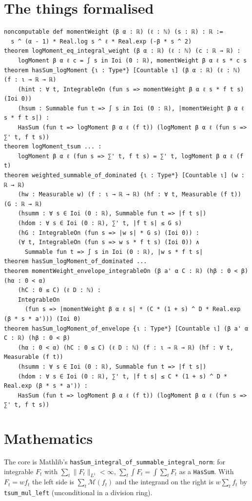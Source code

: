 \documentclass[11pt]{article}
\begin{document}
\section{The things formalised}
{\small
\begin{verbatim}
noncomputable def momentWeight (β α : ℝ) (ℓ : ℕ) (s : ℝ) : ℝ :=
  s ^ (α - 1) * Real.log s ^ ℓ * Real.exp (-β * s ^ 2)
theorem logMoment_eq_integral_weight (β α : ℝ) (ℓ : ℕ) (c : ℝ → ℝ) :
    logMoment β α ℓ c = ∫ s in Ioi (0 : ℝ), momentWeight β α ℓ s * c s
theorem hasSum_logMoment {ι : Type*} [Countable ι] (β α : ℝ) (ℓ : ℕ) (f : ι → ℝ → ℝ)
    (hint : ∀ t, IntegrableOn (fun s => momentWeight β α ℓ s * f t s) (Ioi 0))
    (hsum : Summable fun t => ∫ s in Ioi (0 : ℝ), |momentWeight β α ℓ s * f t s|) :
    HasSum (fun t => logMoment β α ℓ (f t)) (logMoment β α ℓ (fun s => ∑' t, f t s))
theorem logMoment_tsum ... :
    logMoment β α ℓ (fun s => ∑' t, f t s) = ∑' t, logMoment β α ℓ (f t)
theorem weighted_summable_of_dominated {ι : Type*} [Countable ι] (w : ℝ → ℝ)
    (hw : Measurable w) (f : ι → ℝ → ℝ) (hf : ∀ t, Measurable (f t)) (G : ℝ → ℝ)
    (hsumm : ∀ s ∈ Ioi (0 : ℝ), Summable fun t => |f t s|)
    (hdom : ∀ s ∈ Ioi (0 : ℝ), ∑' t, |f t s| ≤ G s)
    (hG : IntegrableOn (fun s => |w s| * G s) (Ioi 0)) :
    (∀ t, IntegrableOn (fun s => w s * f t s) (Ioi 0)) ∧
      Summable fun t => ∫ s in Ioi (0 : ℝ), |w s * f t s|
theorem hasSum_logMoment_of_dominated ...
theorem momentWeight_envelope_integrableOn (β a' α C : ℝ) (hβ : 0 < β) (hα : 0 < α)
    (hC : 0 ≤ C) (ℓ D : ℕ) :
    IntegrableOn
      (fun s => |momentWeight β α ℓ s| * (C * (1 + s) ^ D * Real.exp (β * s * a'))) (Ioi 0)
theorem hasSum_logMoment_of_envelope {ι : Type*} [Countable ι] (β a' α C : ℝ) (hβ : 0 < β)
    (hα : 0 < α) (hC : 0 ≤ C) (ℓ D : ℕ) (f : ι → ℝ → ℝ) (hf : ∀ t, Measurable (f t))
    (hsumm : ∀ s ∈ Ioi (0 : ℝ), Summable fun t => |f t s|)
    (hdom : ∀ s ∈ Ioi (0 : ℝ), ∑' t, |f t s| ≤ C * (1 + s) ^ D * Real.exp (β * s * a')) :
    HasSum (fun t => logMoment β α ℓ (f t)) (logMoment β α ℓ (fun s => ∑' t, f t s))
\end{verbatim}
}

\section{Mathematics}

The core is Mathlib's \texttt{hasSum\_integral\_of\_summable\_integral\_norm}: for integrable
$F_t$ with $\sum_t\|F_t\|_{L^1}<\infty$, $\sum_t\int F_t=\int\sum_tF_t$ as a \texttt{HasSum}. With
$F_t=wf_t$ the left side is $\sum_t\mathcal M(f_t)$ and the integrand on the right is
$w\sum_tf_t$ by \texttt{tsum\_mul\_left} (unconditional in a division ring).
\end{document}
